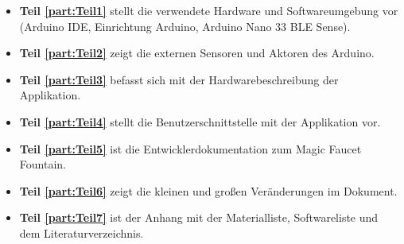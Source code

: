\begin{itemize}
	\item \textbf{Teil \ref{part:Teil1}} stellt die verwendete Hardware und Softwareumgebung vor (Arduino IDE, Einrichtung Arduino, Arduino Nano 33 BLE Sense). 
	\item \textbf{Teil \ref{part:Teil2}} zeigt die externen Sensoren und Aktoren des Arduino.
	\item \textbf{Teil \ref{part:Teil3}} befasst sich mit der Hardwarebeschreibung der Applikation.
	\item \textbf{Teil \ref{part:Teil4}} stellt die Benutzerschnittstelle mit der Applikation vor.
	\item \textbf{Teil \ref{part:Teil5}} ist die Entwicklerdokumentation zum Magic Faucet Fountain.
	\item \textbf{Teil \ref{part:Teil6}} zeigt die kleinen und großen Veränderungen im Dokument.
	\item \textbf{Teil \ref{part:Teil7}} ist der Anhang mit der Materialliste, Softwareliste und dem Literaturverzeichnis.
\end{itemize}
